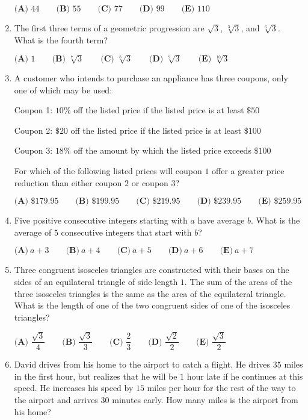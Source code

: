 \documentclass{article}
\begin{document}
\begin{enumerate}[label=\arabic*., itemsep=0.5em]
\(\textbf{(A) }44\qquad
\textbf{(B) }55\qquad
\textbf{(C) }77\qquad
\textbf{(D) }99\qquad
\textbf{(E) }110\)\par \vspace{0.5em}\item The first three terms of a geometric progression are \(\sqrt 3\), \(\sqrt[3]3\), and \(\sqrt[6]3\).  What is the fourth term?

\(\textbf{(A) }1\qquad
\textbf{(B) }\sqrt[7]3\qquad
\textbf{(C) }\sqrt[8]3\qquad
\textbf{(D) }\sqrt[9]3\qquad
\textbf{(E) }\sqrt[10]3\qquad\)\par \vspace{0.5em}\item A customer who intends to purchase an appliance has three coupons, only one of which may be used:

Coupon 1: \(10\%\) off the listed price if the listed price is at least \(\$50\)

Coupon 2: \(\$20\) off the listed price if the listed price is at least \(\$100\)

Coupon 3: \(18\%\) off the amount by which the listed price exceeds \(\$100\)

For which of the following listed prices will coupon \(1\) offer a greater price reduction than either coupon \(2\) or coupon \(3\)?

\(\textbf{(A) }\$179.95\qquad
\textbf{(B) }\$199.95\qquad
\textbf{(C) }\$219.95\qquad
\textbf{(D) }\$239.95\qquad
\textbf{(E) }\$259.95\qquad\)\par \vspace{0.5em}\item Five positive consecutive integers starting with \(a\) have average \(b\). What is the average of \(5\) consecutive integers that start with \(b\)?

\( \textbf{(A)}\ a+3\qquad\textbf{(B)}\ a+4\qquad\textbf{(C)}\ a+5\qquad\textbf{(D)}\ a+6\qquad\textbf{(E)}\ a+7\)\par \vspace{0.5em}\item Three congruent isosceles triangles are constructed with their bases on the sides of an equilateral triangle of side length \(1\).  The sum of the areas of the three isosceles triangles is the same as the area of the equilateral triangle.  What is the length of one of the two congruent sides of one of the isosceles triangles?

\(\textbf{(A) }\dfrac{\sqrt3}4\qquad
\textbf{(B) }\dfrac{\sqrt3}3\qquad
\textbf{(C) }\dfrac23\qquad
\textbf{(D) }\dfrac{\sqrt2}2\qquad
\textbf{(E) }\dfrac{\sqrt3}2\)\par \vspace{0.5em}\item David drives from his home to the airport to catch a flight.  He drives \(35\) miles in the first hour, but realizes that he will be \(1\) hour late if he continues at this speed.  He increases his speed by \(15\) miles per hour for the rest of the way to the airport and arrives \(30\) minutes early.  How many miles is the airport from his home?


\end{enumerate}
\end{document}
